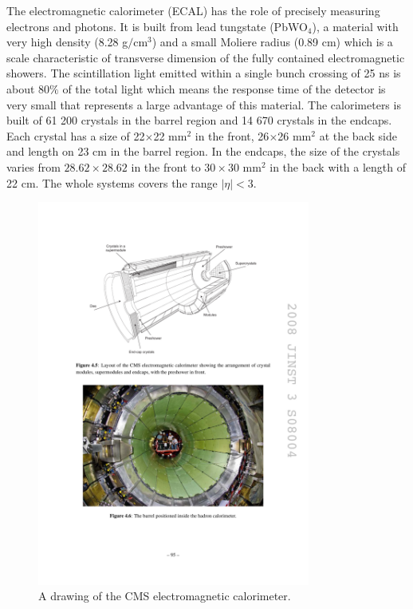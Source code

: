 The electromagnetic calorimeter (ECAL) has the role of precisely measuring electrons and photons. It is built from lead tungstate (PbWO$_4$), a material with very high density (8.28 g$/$cm$^3$) and a small Moliere radius (0.89 cm) which is a scale characteristic of transverse dimension of the fully contained electromagnetic showers. The scintillation light emitted within a single bunch crossing of 25 ns is about 80$\%$ of the total light which means the response time of the detector is very small that represents a large advantage of this material. The calorimeters is built of 61 200 crystals in the barrel region and 14 670 crystals in the endcaps. Each crystal has a size of 22$\times $22 mm$^2$ in the front, 26$\times$26 mm$^2$ at the back side and length on 23 cm in the barrel region. In the endcaps, the size of the crystals varies from $28.62\times 28.62$ in the front to $30\times 30$ mm$^2$ in the back with a length of 22 cm. The whole systems covers the range $|\eta|<3$.
\begin{figure}[htbp]
	\centering
		\includegraphics[width=0.8\textwidth]{Figures/ECAL.pdf}
	\caption[CMS Electromagnetic Calorimeter]{A drawing of the CMS electromagnetic calorimeter. \cite{Chatrchyan:2008aa}}
	\label{fig:ECAL}
\end{figure}
